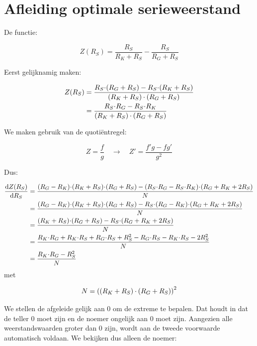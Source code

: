 \documentclass[12pt,a4paper,final,twoside,fleqn]{article}
\let\oldcdot\cdot
\renewcommand{\cdot}{\kern-.10em\oldcdot\kern-.10em}
\newcommand{\cdotw}{\kern.08em\oldcdot\kern.08em}
\begin{document}
\clearpage
\section{Afleiding optimale serieweerstand}
\label{app:afleiding}
De functie:

\begin{equation}
Z(R_S) = \dfrac{R_S}{R_K+R_S}-\dfrac{R_S}{R_G+R_S}
\end{equation}

Eerst gelijknamig maken:

\begin{equation}
\begin{split}
Z(R_S) &= \dfrac{R_S\cdot(R_G+R_S)-R_S\cdot(R_K+R_S)}{(R_K+R_S)\cdotw(R_G+R_S)} \\
       &= \dfrac{R_S\cdot R_G - R_S\cdot R_K}{(R_K+R_S)\cdotw(R_G+R_S)}
\end{split}
\end{equation}

We maken gebruik van de quoti\"entregel:

\begin{equation}
Z = \dfrac{f}{g} \quad \rightarrow \quad Z' = \dfrac{f'g-fg'}{g^2}
\end{equation}

Dus:

\begin{equation}
\begin{split}
\dfrac{\text{d} Z(R_S)}{\text{d} R_S} &= 
\dfrac{(R_G-R_K)\cdot(R_K+R_S)\cdot(R_G+R_S) - (R_S\cdot R_G - R_S\cdot R_K)\cdot(R_G+R_K+2R_S)}{N} \\
&= \dfrac{(R_G-R_K)\cdot(R_K+R_S)\cdot(R_G+R_S) - R_S\cdot(R_G - R_K)\cdot(R_G+R_K+2R_S)}{N} \\
&= \dfrac{(R_K+R_S)\cdot(R_G+R_S) - R_S\cdot(R_G+R_K+2R_S)}{N} \\
&= \dfrac{R_K\cdot R_G + R_K\cdot R_S + R_G\cdot R_S + R_S^2 - R_G\cdot R_S - R_K\cdot R_S -2R_S^2}{N} \\
&= \dfrac{R_K\cdot R_G - R_S^2}{N}
\end{split}
\end{equation}
met

\begin{equation}
N = \left((R_K+R_S)\cdotw(R_G+R_S)\right)^2
\end{equation}

We stellen de afgeleide gelijk aan 0 om de extreme te bepalen. Dat houdt in dat
de teller 0 moet zijn en de noemer ongelijk aan 0 moet zijn. Aangezien alle
weerstandswaarden groter dan 0 zijn, wordt aan de tweede voorwaarde automatisch
voldaan. We bekijken dus alleen de noemer:
\end{document}
